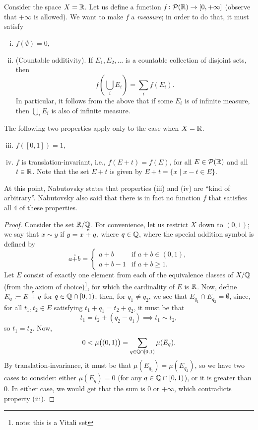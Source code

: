 Consider the space $X = \mathbb R$. Let us define a function $f \colon \mathcal P(\mathbb R) \to [0, +\infty]$ (observe that $+\infty$ is allowed). We want to make $f$ a \textit{measure}; in order to do that, it must satisfy
\begin{enumerate}[(i)]
    \item $f(\emptyset) = 0$,
    \item (Countable additivity). If $E_1, E_2, \dots$ is a countable collection of disjoint sets, then
    \[ f\left(\bigcup_i E_i\right) = \sum_i f(E_i). \]
    In particular, it follows from the above that if some $E_i$ is of infinite measure, then $\bigcup_i E_i$ is also of infinite measure.
\end{enumerate}
The following two properties apply only to the case when $X = \mathbb R$.
\begin{enumerate}[(i)]
    \setcounter{enumi}{2}
    \item $f([0, 1]) = 1$,
    \item $f$ is translation-invariant, i.e., $f(E + t) = f(E)$, for all $E \in \mathcal P(\mathbb R)$ and all $t \in \mathbb R$. Note that the set $E + t$ is given by $E + t = \{x \mid x - t \in E\}$.
\end{enumerate}
At this point, Nabutovsky states that properties (iii) and (iv) are ``kind of arbitrary''. Nabutovsky also said that there is in fact no function $f$ that satisfies all $4$ of these properties.
\begin{proof}
    Consider the set $\mathbb R / \mathbb Q$. For convenience, let us restrict $X$ down to $(0, 1)$; we say that $x \sim y$ if $y = \smash{x \stackrel{\circ}{+} q}$, where $q \in \mathbb Q$, where the special addition symbol is defined by
    \[ a \stackrel{\circ}{+} b = \begin{cases} a + b & \text{if } a + b \in (0, 1), \\ a + b - 1 & \text{if } a + b \geq 1. \end{cases} \]
    Let $E$ consist of exactly one element from each of the equivalence classes of $X / \mathbb Q$ (from the axiom of choice)\footnote{note: this is a Vitali set}, for which the cardinality of $E$ is $\mathbb R$. Now, define $E_q \coloneq \smash{E \stackrel{\circ}{+} q}$ for $q \in \mathbb Q \cap [0, 1)$; then, for $q_1 \neq q_2$, we see that $E_{q_1} \cap E_{q_2} = \emptyset$, since, for all $t_1, t_2 \in E$ satisfying $t_1 + q_1 = t_2 + q_2$, it must be that
    \[ t_1 = t_2 + (q_2 - q_1) \implies t_1 \sim t_2, \]
    so $t_1 = t_2$. Now,
    \[ 0 < \mu\bigl((0, 1)\bigr) = \sum_{q \in \mathbb Q \cap [0, 1)} \mu(E_q). \]
    By translation-invariance, it must be that $\mu(E_{q_1}) = \mu(E_{q_2})$, so we have two cases to consider: either $\mu(E_q) = 0$ (for any $q \in \mathbb Q \cap [0, 1)$), or it is greater than $0$. In either case, we would get that the sum is $0$ or $+\infty$, which contradicts property (iii).
\end{proof}
